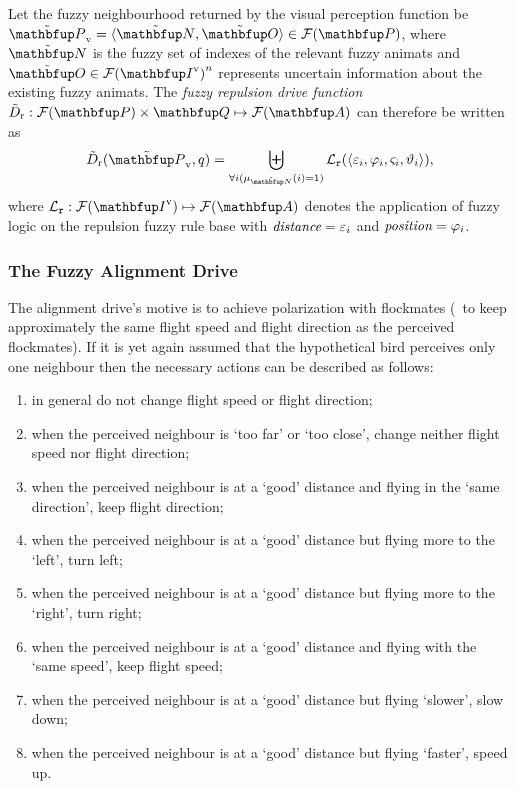 \begin{definition}
\label{def:fuzzyAnimat:Dr:afd} 
Let the fuzzy neighbourhood returned by the visual perception function be $\fset{P}_\textnormal{v}=\langle \fset{N}, \fset{O} \rangle \in \fpowset{\set{P}}$, where $\fset{N}$ is the fuzzy set of indexes of the relevant fuzzy animats and $\fset{O} \in \fpowset{\set{I}^\textnormal{v}}^n$ represents uncertain information about the existing fuzzy animats. The \emph{fuzzy repulsion drive function} $\ffunc{D}_\textnormal{r}:\fpowset{\set{P}} \times \set{Q} \mapsto \fpowset{\set{A}}$ can therefore be written as
\begin{equation}
\ffunc{D}_\textnormal{r}(\fset{P}_\textnormal{v},q)=%
 \biguplus_{\forall i(\mu_\fset{N}(i)=1)} \mathcal{L}_\texttt{r}(\langle \varepsilon_i, \varphi_i, \varsigma_i, \vartheta_i \rangle),
\end{equation}
where $\mathcal{L}_\texttt{r}: \fpowset{\set{I}^\textnormal{v}} \mapsto \fpowset{\set{A}}$ denotes the application of fuzzy logic on the repulsion fuzzy rule base with $\emph{distance}=\varepsilon_i$ and $\emph{position}=\varphi_i$.
\end{definition}

\subsubsection{The Fuzzy Alignment Drive}
The alignment drive's motive is to achieve polarization with flockmates (\ie\ to keep approximately the same flight speed and flight direction as the perceived flockmates). If it is yet again assumed that the hypothetical bird perceives only one neighbour then the necessary actions can be described as follows:

\begin{enumerate}
\item in general do not change flight speed or flight direction;
\item when the perceived neighbour is `too far' or `too close', change neither flight speed nor flight direction;
\item when the perceived neighbour is at a `good' distance and flying in the `same direction', keep flight direction;
\item when the perceived neighbour is at a `good' distance but flying more to the `left', turn left;
\item when the perceived neighbour is at a `good' distance but flying more to the `right', turn right;
\item when the perceived neighbour is at a `good' distance and flying with the `same speed', keep flight speed;
\item when the perceived neighbour is at a `good' distance but flying `slower', slow down;
\item when the perceived neighbour is at a `good' distance but flying `faster', speed up.
\end{enumerate}

